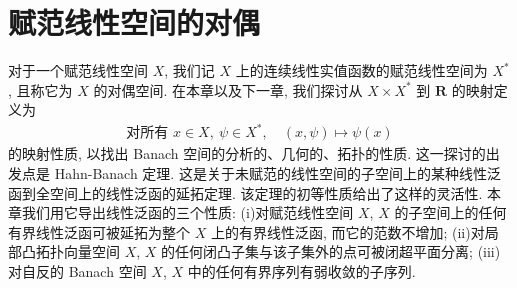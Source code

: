 \documentclass[../main.tex]{subfiles}
\begin{document}
\chapter{赋范线性空间的对偶}\label{chapter:ch14-对偶}

对于一个赋范线性空间 $X$, 我们记 $X$ 上的连续线性实值函数的赋范线性空间为 $X^{*}$, 且称它为 $X$ 的对偶空间. 在本章以及下一章, 我们探讨从 $X\times X^{*}$ 到 $\mathbf{R}$ 的映射定义为
\begin{align*}
\text{对所有 }x\in X,\ \psi\in X^{*},\quad(x,\psi)\mapsto\psi(x)
\end{align*}
的映射性质, 以找出 Banach 空间的分析的、几何的、拓扑的性质. 这一探讨的出发点是 Hahn-Banach 定理. 这是关于未赋范的线性空间的子空间上的某种线性泛函到全空间上的线性泛函的延拓定理. 该定理的初等性质给出了这样的灵活性. 本章我们用它导出线性泛函的三个性质: (i)对赋范线性空间 $X$, $X$ 的子空间上的任何有界线性泛函可被延拓为整个 $X$ 上的有界线性泛函, 而它的范数不增加; (ii)对局部凸拓扑向量空间 $X$, $X$ 的任何闭凸子集与该子集外的点可被闭超平面分离; (iii)对自反的 Banach 空间 $X$, $X$ 中的任何有界序列有弱收敛的子序列.








\end{document}

